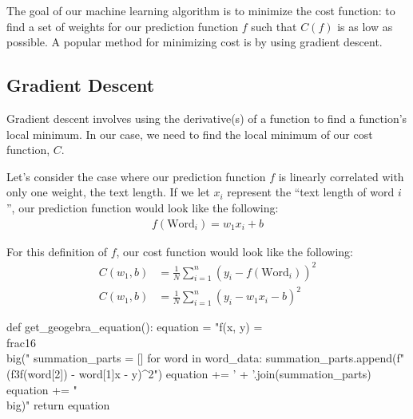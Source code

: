 \documentclass[12pt]{article}
\begin{document}
The goal of our machine learning algorithm is to minimize the cost function: to find a set of weights for our prediction function $f$ such that $C(f)$ is as low as possible. A popular method for minimizing cost is by using gradient descent.

\subsection*{Gradient Descent}

Gradient descent involves using the derivative(s) of a function to find a function's local minimum. In our case, we need to find the local minimum of our cost function, $C$.

Let's consider the case where our prediction function $f$ is linearly correlated with only one weight, the text length. If we let $x_i$ represent the ``text length of word $i$'', our prediction function would look like the following:
\begin{align*}
	f(\text{Word}_i) = w_1x_i + b
\end{align*}

For this definition of $f$, our cost function would look like the following:
\begin{align*}
	C(w_1, b) & = \frac{1}{N} \sum_{i=1}^{n} (y_i - f(\text{Word}_i))^2
	\\
	C(w_1, b) & = \frac{1}{N} \sum_{i=1}^{n} (y_i - w_1x_i - b)^2
\end{align*}

\begin{pycode}
def get_geogebra_equation():
	equation = "f(x, y) = \\frac{1}{6}\\big("
	summation_parts = []
	for word in word_data:
		summation_parts.append(f"({f3f(word[2])} - {word[1]}x - y)^2")
	equation += ' + '.join(summation_parts)
	equation += "\\big)"
	return equation

\end{pycode}
\end{document}
